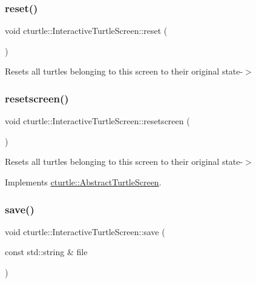 \subsubsection{\texorpdfstring{reset()}{reset()}}
{\footnotesize\ttfamily void cturtle\+::\+Interactive\+Turtle\+Screen\+::reset (\begin{DoxyParamCaption}{ }\end{DoxyParamCaption})\hspace{0.3cm}{\ttfamily [inline]}}

Resets all turtles belonging to this screen to their original state-\/$>$ \mbox{\label{classcturtle_1_1InteractiveTurtleScreen_a06471bf6c8c02768fb0acd89649c72c2}} 
\subsubsection{\texorpdfstring{resetscreen()}{resetscreen()}}
{\footnotesize\ttfamily void cturtle\+::\+Interactive\+Turtle\+Screen\+::resetscreen (\begin{DoxyParamCaption}{ }\end{DoxyParamCaption})\hspace{0.3cm}{\ttfamily [virtual]}}

Resets all turtles belonging to this screen to their original state-\/$>$ 

Implements \hyperlink{classcturtle_1_1AbstractTurtleScreen}{cturtle\+::\+Abstract\+Turtle\+Screen}.

\mbox{\label{classcturtle_1_1InteractiveTurtleScreen_ab0ded9c577f523ca45240e036318553e}} 
\subsubsection{\texorpdfstring{save()}{save()}}
{\footnotesize\ttfamily void cturtle\+::\+Interactive\+Turtle\+Screen\+::save (\begin{DoxyParamCaption}\item[{const std\+::string \&}]{file }\end{DoxyParamCaption})\hspace{0.3cm}{\ttfamily [inline]}}

